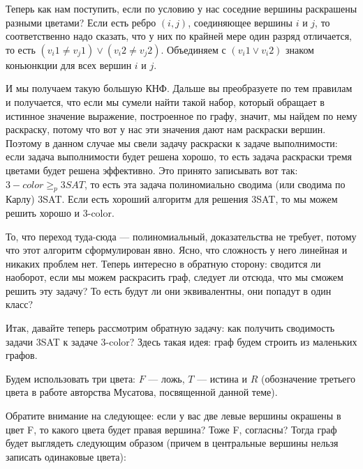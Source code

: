 \documentclass[russian]{lecture-notes}
\theoremstyle{definition}
\begin{document}
		Теперь как нам поступить, если по условию у нас соседние вершины раскрашены разными цветами? Если есть ребро $(i,j)$, соединяющее вершины $i$ и $j$, то соответственно надо сказать, что у них по крайней мере один разряд отличается, то есть $(v_i1 \neq v_j1) \vee (v_i2 \neq v_j2)$. Объединяем с $(v_i1 \vee v_i2)$ знаком коньюнкции для всех вершин $i$ и $j$. 
		
		И мы получаем такую большую КНФ. Дальше вы преобразуете по тем правилам и получается, что если мы сумели найти такой набор, который обращает в истинное значение выражение, построенное по графу, значит, мы найдем по нему раскраску, потому что вот у нас эти значения дают нам раскраски вершин. Поэтому в данном случае мы свели задачу раскраски к задаче выполнимости: если задача выполнимости будет решена хорошо, то есть задача раскраски тремя цветами будет решена эффективно. Это принято записывать вот так: $3-color \geq _p 3SAT$, то есть эта задача полиномиально сводима (или сводима по Карлу) 3SAT.
		Если есть хороший алгоритм для решения 3SAT, то мы можем решить хорошо и 3-color.
		
		То, что переход туда-сюда --- полиномиальный, доказательства не требует, потому что этот алгоритм сформулирован явно. Ясно, что сложность у него линейная и никаких проблем нет.
		Теперь интересно в обратную сторону: сводится ли наоборот, если мы можем раскрасить граф, следует ли отсюда, что мы сможем решить эту задачу? То есть будут ли они эквивалентны, они попадут в один класс?
		
		Итак, давайте теперь рассмотрим обратную задачу: как получить сводимость задачи 3SAT к задаче 3-color? Здесь такая идея: граф будем строить из маленьких графов.
		
		\begin{figure} [H]
			\centering
		\end{figure}
		
		Будем использовать три цвета: $F$ --- ложь, $T$ --- истина и $R$ (обозначение третьего цвета в работе авторства Мусатова, посвященной данной теме).
		
		Обратите внимание на следующее: если у вас две левые вершины окрашены в цвет F, то какого цвета будет правая вершина? Тоже F, согласны? Тогда граф будет выглядеть следующим образом (причем в центральные вершины нельзя записать одинаковые цвета):
		
\end{document}
